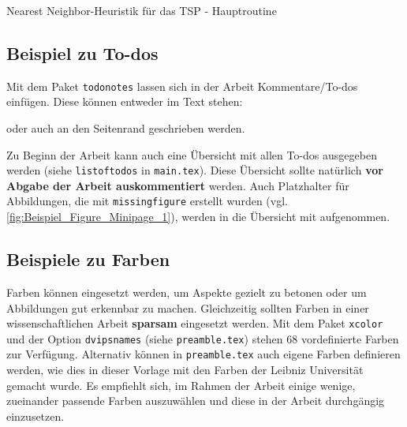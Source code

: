 \begin{algorithm}[H]
	\caption{Nearest Neighbor-Heuristik für das TSP - Hauptroutine}
    \label{alg:Heuristik_TSP}
    \begin{algorithmic}[1]
        		\ENDIF
    		\ENDFOR
		\ENDWHILE
	\end{algorithmic}
\end{algorithm}

\subsection{Beispiel zu To-dos}
Mit dem Paket \texttt{todonotes} lassen sich in der Arbeit Kommentare/To-dos einfügen. Diese können entweder im Text stehen:

oder auch an den Seitenrand  geschrieben werden.

Zu Beginn der Arbeit kann auch eine Übersicht mit allen To-dos ausgegeben werden (siehe \texttt{listoftodos} in \texttt{main.tex}). Diese Übersicht sollte natürlich \textbf{vor Abgabe der Arbeit auskommentiert} werden. Auch Platzhalter für Abbildungen, die mit \texttt{missing\-figure} erstellt wurden (vgl. \autoref{fig:Beispiel_Figure_Minipage_1}), werden in die Übersicht mit aufgenommen.

\subsection{Beispiele zu Farben}
Farben können eingesetzt werden, um Aspekte gezielt zu betonen oder um Abbildungen gut erkennbar zu machen. Gleichzeitig sollten Farben in einer wissenschaftlichen Arbeit \textbf{sparsam} eingesetzt werden. Mit dem Paket \texttt{xcolor} und der Option \texttt{dvipsnames} (siehe \texttt{preamble.tex}) stehen 68 vordefinierte Farben zur Verfügung. Alternativ können in \texttt{preamble.tex} auch eigene Farben definieren werden, wie dies in dieser Vorlage mit den Farben der Leibniz Universität gemacht wurde. Es empfiehlt sich, im Rahmen der Arbeit einige wenige, zueinander passende Farben auszuwählen und diese in der Arbeit durchgängig einzusetzen. 

